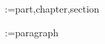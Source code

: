 
\setlength{\parindent}{0pt} %

\setcounter{tocdepth}{4}
\setcounter{secnumdepth}{4}

\usepackage{cleveref}
\makeatletter
\newcommand{\crefnames}[3]{%
  \@for\next:=#1\do{%
    \expandafter\crefname\expandafter{\next}{#2}{#3}%
  }%
}
\makeatother
\crefnames{part,chapter,section}{\S}{\S\S}
\crefnames{paragraph}{\P}{\P\P}

\newcommand{\numlist}[1]{(\textbf{#1})}

\newcommand\numpara{\par\refstepcounter{para}{\thepara}.\space\textbf}
